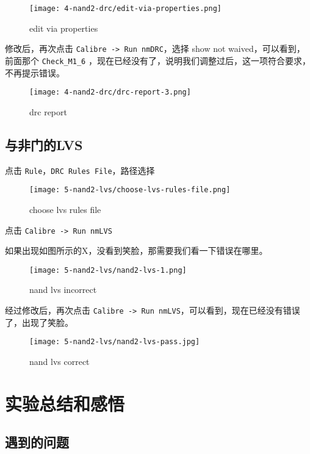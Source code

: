 \documentclass{theme-2614084}
\begin{document}
\begin{figure}[H]
  \centering\texttt{[image: 4-nand2-drc/edit-via-properties.png]}
  \caption{edit via properties}
\end{figure}

修改后，再次点击 \texttt{Calibre -> Run nmDRC}，选择 show not waived，可以看到，前面那个 \texttt{Check\_M1\_6} ，现在已经没有了，说明我们调整过后，这一项符合要求，不再提示错误。

\begin{figure}[H]
  \centering\texttt{[image: 4-nand2-drc/drc-report-3.png]}
  \caption{drc report}
\end{figure}

\subsection{与非门的LVS}

点击 \texttt{Rule}，\texttt{DRC Rules File}，路径选择

\begin{figure}[H]
  \centering\texttt{[image: 5-nand2-lvs/choose-lvs-rules-file.png]}
  \caption{choose lvs rules file}
\end{figure}

点击 \texttt{Calibre -> Run nmLVS}

如果出现如图所示的X，没看到笑脸，那需要我们看一下错误在哪里。

\begin{figure}[H]
  \centering\texttt{[image: 5-nand2-lvs/nand2-lvs-1.png]}
  \caption{nand lvs incorrect}
\end{figure}

经过修改后，再次点击 \texttt{Calibre -> Run nmLVS}，可以看到，现在已经没有错误了，出现了笑脸。

\begin{figure}[H]
  \centering\texttt{[image: 5-nand2-lvs/nand2-lvs-pass.jpg]}
  \caption{nand lvs correct}
\end{figure}

\section{实验总结和感悟}

\subsection{遇到的问题}
\end{document}
